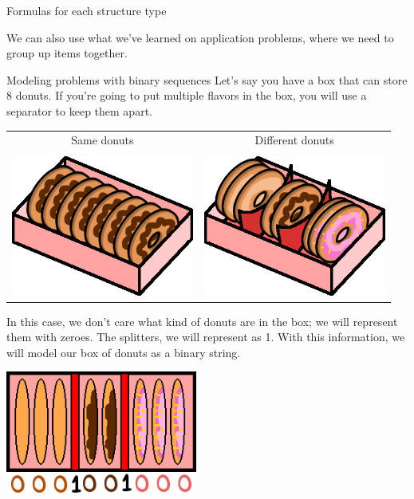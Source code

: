 {\begin{intro}{Formulas for each structure type}
    \end{intro}

    We can also use what we've learned on application problems, where we need to
    group up items together.

    \newpage

    \begin{intro}{Modeling problems with binary sequences}
        Let's say you have a box that can store 8 donuts.
        If you're going to put multiple flavors in the box, you will
        use a separator to keep them apart.

        \begin{center}
            \begin{tabular}{c c}
                Same donuts & 
                Different donuts
                \\ \\
                \centering
                \includegraphics[width=6cm]{images/donutbox1.png}
                &
                \includegraphics[width=6cm]{images/donutbox2.png}
            \end{tabular}
        \end{center}

        In this case, we don't care what kind of donuts are in the box;
        we will represent them with zeroes. The splitters, we will represent as 1.
        With this information, we will model our box of donuts as a binary string.

        \begin{center}
            \includegraphics[height=4cm]{images/donutbox3.png}
        \end{center}
    \end{intro}
    
}
